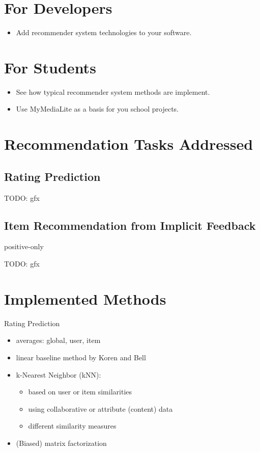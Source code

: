 \documentclass[a4paper, foldmark, 12pt]{leaflet}
\begin{document}
\section{For Developers}
\begin{itemize}
	\item Add recommender system technologies to your software.
\end{itemize}

\section{For Students}
\begin{itemize}
	\item See how typical recommender system methods are implement.
	\item Use MyMediaLite as a basis for you school projects.
\end{itemize}

\section{Recommendation Tasks Addressed}

\subsection{Rating Prediction}
TODO: gfx

\subsection{Item Recommendation from Implicit Feedback}
positive-only

TODO: gfx

\newpage 

\section{Implemented Methods}
Rating Prediction
\begin{itemize}
	\item averages: global, user, item
	\item linear baseline method by Koren and Bell
	\item k-Nearest Neighbor (kNN):
		\begin{itemize}
			\item based on user or item similarities
			\item using collaborative or attribute (content) data
			\item different similarity measures
		\end{itemize}
	\item (Biased) matrix factorization
\end{itemize}
\end{document}
